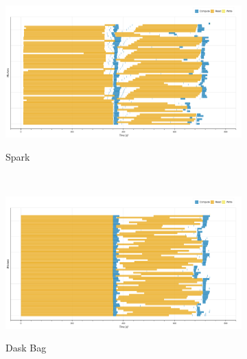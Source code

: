 \documentclass[conference]{IEEEtran}
\begin{document}
\begin{figure}[!tb]
    \centering
    \begin{subfigure}[b]{\columnwidth}
        \href{https://mathdugre.github.io/paper-big-data-engines/spark-histo_np-baseline.html}{
        \includegraphics[clip,width=\columnwidth,
        height=0.15\textheight]{images/spark_histo_np_gantt.png}}
        \caption{Spark}\label{fig:histo_np_spark_gantt}
    \end{subfigure}
    \\
    \begin{subfigure}[b]{\columnwidth}
        \href{https://mathdugre.github.io/paper-big-data-engines/dask-bag-histo_np-baseline.html}{
        \includegraphics[clip,width=\columnwidth,
        height=0.15\textheight]{images/bag_histo_np_gantt.png}}
        \caption{Dask Bag}\label{fig:histo_np_dask_bag_gantt}
    \end{subfigure}
    \\
    \begin{subfigure}[b]{\columnwidth}
        \href{https://mathdugre.github.io/paper-big-data-engines/dask-delayed-histo_np-baseline.html}{
}
\end{subfigure}
\end{figure}
\end{document}
